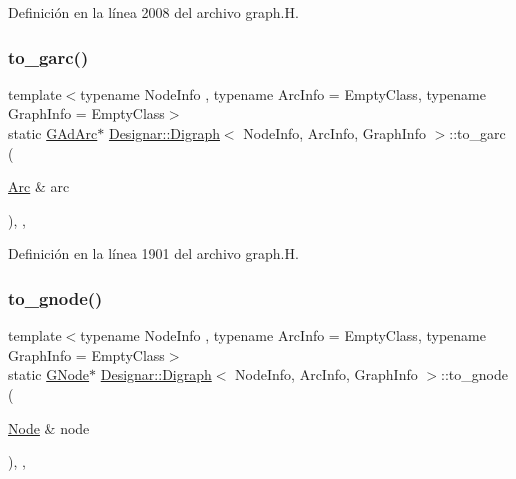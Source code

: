 Definición en la línea 2008 del archivo graph.\+H.

\mbox{\label{class_designar_1_1_digraph_a6137e6849dcb4208e9c8daa26f303868}} 
\subsubsection{\texorpdfstring{to\+\_\+garc()}{to\_garc()}}
{\footnotesize\ttfamily template$<$typename Node\+Info , typename Arc\+Info  = Empty\+Class, typename Graph\+Info  = Empty\+Class$>$ \\
static \hyperlink{class_designar_1_1_digraph_a0c6d846f23d1e82556fb6055557df53f}{G\+Ad\+Arc}$\ast$ \hyperlink{class_designar_1_1_digraph}{Designar\+::\+Digraph}$<$ Node\+Info, Arc\+Info, Graph\+Info $>$\+::to\+\_\+garc (\begin{DoxyParamCaption}\item[{\hyperlink{class_designar_1_1_digraph_a0ceb278671f2a535c00fddccdeafd69f}{Arc} \&}]{arc }\end{DoxyParamCaption})\hspace{0.3cm}{\ttfamily [inline]}, {\ttfamily [static]}, {\ttfamily [protected]}}



Definición en la línea 1901 del archivo graph.\+H.

\mbox{\label{class_designar_1_1_digraph_ae0a945e347e8e6a15df21df4fe2c1782}} 
\subsubsection{\texorpdfstring{to\+\_\+gnode()}{to\_gnode()}}
{\footnotesize\ttfamily template$<$typename Node\+Info , typename Arc\+Info  = Empty\+Class, typename Graph\+Info  = Empty\+Class$>$ \\
static \hyperlink{class_designar_1_1_digraph_a33b0d2b8820ada501522b0e67e63524a}{G\+Node}$\ast$ \hyperlink{class_designar_1_1_digraph}{Designar\+::\+Digraph}$<$ Node\+Info, Arc\+Info, Graph\+Info $>$\+::to\+\_\+gnode (\begin{DoxyParamCaption}\item[{\hyperlink{class_designar_1_1_digraph_a4dc921c41a480b7946a04170e997d8ae}{Node} \&}]{node }\end{DoxyParamCaption})\hspace{0.3cm}{\ttfamily [inline]}, {\ttfamily [static]}, {\ttfamily [protected]}}



